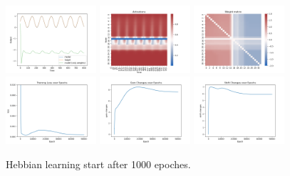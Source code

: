 \documentclass[12pt, a4paper]{article}
\begin{document}
\begin{figure}[H]
    \centering
    \includegraphics[width=0.3\textwidth]{analysis/fig/0122_SIN2_bphebbpt_output.png}
    \includegraphics[width=0.3\textwidth]{analysis/fig/0122_SIN2_bphebbpt_activations.png}
    \includegraphics[width=0.3\textwidth]{analysis/fig/0122_SIN2_bphebbpt_weight_matrix.png}\\
    \includegraphics[width=0.3\textwidth]{analysis/fig/0122_SIN2_bphebbpt_loss.png}
    \includegraphics[width=0.3\textwidth]{analysis/fig/0122_SIN2_bphebbpt_gc.png}
    \includegraphics[width=0.3\textwidth]{analysis/fig/0122_SIN2_bphebbpt_sc.png}\\
    \caption{Hebbian learning start after 1000 epoches.}
\end{figure}
\end{document}
